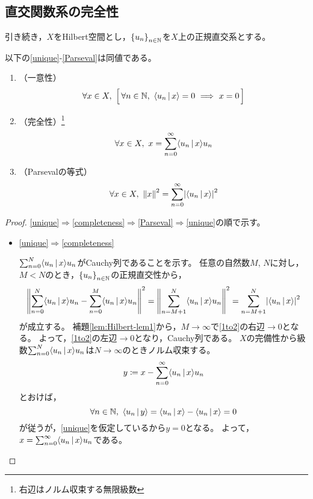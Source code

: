 \documentclass[a4paper,draft]{ltjsarticle}
\begin{document}
\subsection{直交関数系の完全性}
引き続き，$X$をHilbert空間とし，$\seq{u_n}{n\in\N}$を$X$上の正規直交系とする。
\begin{prop}[完全性と同値な命題]\label{命題：完全性}
    以下の\ref{unique}-\ref{Parseval}は同値である。
    \begin{enumerate}[label=(\roman*)]
        \item （一意性）\label{unique}
        \begin{equation}
            \forall x\in X,\ \bsqu{\,
                \forall n\in \N,\ \inner{u_n}{x}=0\ \Longrightarrow\ x=0\,
            }
        \end{equation}
        \item （完全性）\footnote{右辺はノルム収束する無限級数} \label{completeness}
        \begin{equation}
            \forall x\in X,\ x=\sum_{n=0}^\infty \inner{u_n}{x}u_n
        \end{equation}
        \item （Parsevalの等式）\label{Parseval}
        \begin{equation}
            \forall x\in X,\ \norm{x}^2=\sum_{n=0}^\infty \abs{\inner{u_n}{x}}^2
        \end{equation}
    \end{enumerate}
    \begin{proof}
        \ref{unique}$\Rightarrow$\ref{completeness}$\Rightarrow$\ref{Parseval}$\Rightarrow$\ref{unique}の順で示す。
        \begin{itemize}
            \item \ref{unique}$\Rightarrow$\ref{completeness}

            $\sum_{n=0}^N\inner{u_n}{x}u_n$がCauchy列であることを示す。
            任意の自然数$M$, $N$に対し，$M<N$のとき，$\seq{u_n}{n\in\N}$の正規直交性から，
            \begin{equation}
                \norm{\sum_{n=0}^N \inner{u_n}{x}u_n-\sum_{n=0}^M \inner{u_n}{x}u_n}^2
                =\norm{\sum_{n=M+1}^N \inner{u_n}{x}u_n}^2=\sum_{n=M+1}^N \abs{\inner{u_n}{x}}^2\label{1to2}
            \end{equation}
            が成立する。
            補題\ref{lem:Hilbert-lem1}から，$M\to \infty$で\eqref{1to2}の右辺$\to 0$となる。
            よって，\eqref{1to2}の左辺$\to0$となり，Cauchy列である。
            $X$の完備性から級数$\sum_{n=0}^N\inner{u_n}{x}u_n$は$N\to\infty$のときノルム収束する。
            \begin{equation}
                y\coloneqq x - \sum_{n=0}^\infty \inner{u_n}{x}u_n
            \end{equation}
            とおけば，
            \begin{equation}
                \forall n\in \N,\ \inner{u_n}{y}=\inner{u_n}{x}-\inner{u_n}{x}=0
            \end{equation}
            が従うが，\ref{unique}を仮定しているから$y=0$となる。
            よって，$x=\sum_{n=0}^\infty \inner{u_n}{x}u_n$である。


\end{itemize}
\end{proof}
\end{prop}
\end{document}
